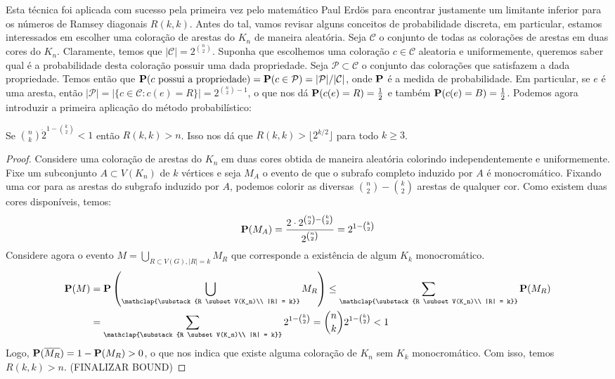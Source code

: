 Esta técnica foi aplicada com sucesso pela primeira vez pelo matemático Paul Erdös para encontrar justamente um limitante inferior para os números de Ramsey diagonais $R(k,k)$. Antes do tal, vamos revisar alguns conceitos de probabilidade discreta, em particular, estamos interessados em escolher uma coloração de arestas do $K_n$ de maneira aleatória. Seja $\mathcal{C}$ o conjunto de todas as colorações de arestas em duas cores do $K_n$. Claramente, temos que $|\mathcal{C}| = 2^{\binom{n}{2}}$.
Suponha que escolhemos uma coloração $c \in \mathcal{C}$ aleatoria e uniformemente, queremos saber qual é a probabilidade desta coloração possuir uma dada propriedade. Seja $\mathcal{P} \subset \mathcal{C}$ o conjunto das colorações que satisfazem a dada propriedade. Temos então que $\operatorname{\mathbf{P}}(c \text{ possui a propriedade}) = \operatorname{\mathbf{P}}(c \in \mathcal{P}) = |\mathcal{P}| / |\mathcal{C}|$, onde $\operatorname{\mathbf{P}}$ é a medida de probabilidade.
Em particular, se $e$ é uma aresta, então $|\mathcal{P}| = |\{c \in \mathcal{C} : c(e) = R \}| = 2^{\binom{n}{2}-1}$, o que nos dá $\operatorname{\mathbf{P}}(c(e) = R) = \frac{1}{2}$ e também $\operatorname{\mathbf{P}}(c(e) = B) = \frac{1}{2}$. Podemos agora introduzir a primeira aplicação do método probabilístico:

\begin{theorem}[Erdös, 1947]
Se $\displaystyle \binom{n}{k} \dot 2^{1 - \binom{k}{2}} < 1$ então $R(k,k) > n$. Isso nos dá que $R(k,k) > \lfloor 2^{k/2} \rfloor$ para todo $k \geq 3$.
\end{theorem}
\begin{proof}
Considere uma coloração de arestas do $K_n$ em duas cores obtida de maneira aleatória colorindo independentemente e uniformemente. Fixe um subconjunto $A \subset V(K_n)$ de $k$ vértices e seja $M_A$ o evento de que o subrafo completo induzido por $A$ é monocromático. Fixando uma cor para as arestas do subgrafo induzido por $A$, podemos colorir as diversas $\binom{n}{2} - \binom{k}{2}$ arestas de qualquer cor. Como existem duas cores disponíveis, temos:
\[ \operatorname{\mathbf{P}}(M_A) = \frac{2\cdot 2^{\binom{n}{2} - \binom{k}{2}}}{2^{\binom{n}{2}}}  = 2^{1 - \binom{k}{2}} \]
Considere agora o evento $M = \bigcup_{R \subset V(G), |R|=k}M_R$ que corresponde a existência de algum $K_k$ monocromático.
\begin{align*}
\prob(M) &= \prob\left (\bigcup_{\mathclap{\substack{R \subset V(K_n)\\ |R| = k}}}M_R \right) \leq \sum_{\mathclap{\substack{R \subset V(K_n)\\ |R| = k}}}\prob(M_R) \\
&= \sum_{\mathclap{\substack{R \subset V(K_n)\\ |R| = k}}} 2^{1 - \binom{k}{2}} = \binom{n}{k} 2^{1 - \binom{k}{2}} < 1
\end{align*}
Logo, $\operatorname{\mathbf{P}}(\overline{M_R}) = 1 - \operatorname{\mathbf{P}}(M_R) > 0$, o que nos indica que existe alguma coloração de $K_n$ sem $K_k$ monocromático. Com isso, temos $R(k,k) > n$.
(FINALIZAR BOUND)
\end{proof}


